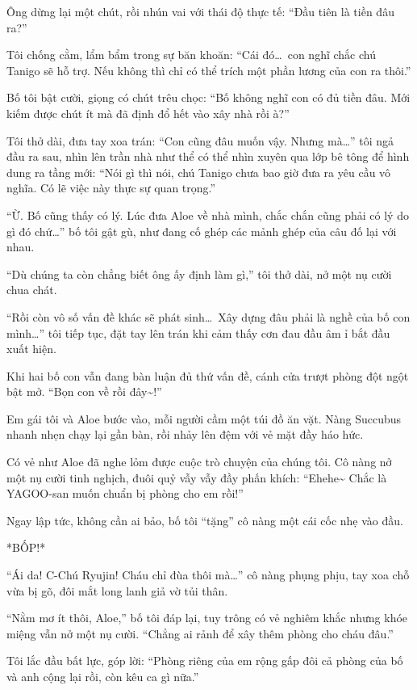 \documentclass[../main.tex]{subfiles}
\begin{document}
Ông dừng lại một chút, rồi nhún vai với thái độ thực tế: ``Đầu tiên là tiền đâu ra?''

Tôi chống cằm, lẩm bẩm trong sự băn khoăn: ``Cái đó\dots\ con nghĩ chắc chú Tanigo sẽ hỗ trợ. Nếu không thì chỉ có thể trích một phần lương của con ra thôi.''

Bố tôi bật cười, giọng có chút trêu chọc: ``Bố không nghĩ con có đủ tiền đâu. Mới kiếm được chút ít mà đã định đổ hết vào xây nhà rồi à?''

Tôi thở dài, đưa tay xoa trán: ``Con cũng đâu muốn vậy. Nhưng mà\dots'' tôi ngả đầu ra sau, nhìn lên trần nhà như thể có thể nhìn xuyên qua lớp bê tông để hình dung ra tầng mới: ``Nói gì thì nói, chú Tanigo chưa bao giờ đưa ra yêu cầu vô nghĩa. Có lẽ việc này thực sự quan trọng.''

``Ừ. Bố cũng thấy có lý. Lúc đưa Aloe về nhà mình, chắc chắn cũng phải có lý do gì đó chứ\dots'' bố tôi gật gù, như đang cố ghép các mảnh ghép của câu đố lại với nhau.

``Dù chúng ta còn chẳng biết ông ấy định làm gì,'' tôi thở dài, nở một nụ cười chua chát.

``Rồi còn vô số vấn đề khác sẽ phát sinh\dots\ Xây dựng đâu phải là nghề của bố con mình\dots'' tôi tiếp tục, đặt tay lên trán khi cảm thấy cơn đau đầu âm ỉ bắt đầu xuất hiện.

Khi hai bố con vẫn đang bàn luận đủ thứ vấn đề, cánh cửa trượt phòng đột ngột bật mở. ``Bọn con về rồi đây\~{}!''

Em gái tôi và Aloe bước vào, mỗi người cầm một túi đồ ăn vặt. Nàng Succubus nhanh nhẹn chạy lại gần bàn, rồi nhảy lên đệm với vẻ mặt đầy háo hức.

Có vẻ như Aloe đã nghe lỏm được cuộc trò chuyện của chúng tôi. Cô nàng nở một nụ cười tinh nghịch, đuôi quỷ vẫy vẫy đầy phấn khích: ``Ehehe\~{} Chắc là YAGOO-san muốn chuẩn bị phòng cho em rồi!''

Ngay lập tức, không cần ai bảo, bố tôi ``tặng'' cô nàng một cái cốc nhẹ vào đầu.

*BỐP!*

``Ái da! C-Chú Ryujin! Cháu chỉ đùa thôi mà\dots'' cô nàng phụng phịu, tay xoa chỗ vừa bị gõ, đôi mắt long lanh giả vờ tủi thân.

``Nằm mơ ít thôi, Aloe,'' bố tôi đáp lại, tuy trông có vẻ nghiêm khắc nhưng khóe miệng vẫn nở một nụ cười. ``Chẳng ai rảnh để xây thêm phòng cho cháu đâu.''

Tôi lắc đầu bất lực, góp lời: ``Phòng riêng của em rộng gấp đôi cả phòng của bố và anh cộng lại rồi, còn kêu ca gì nữa.''
\end{document}
